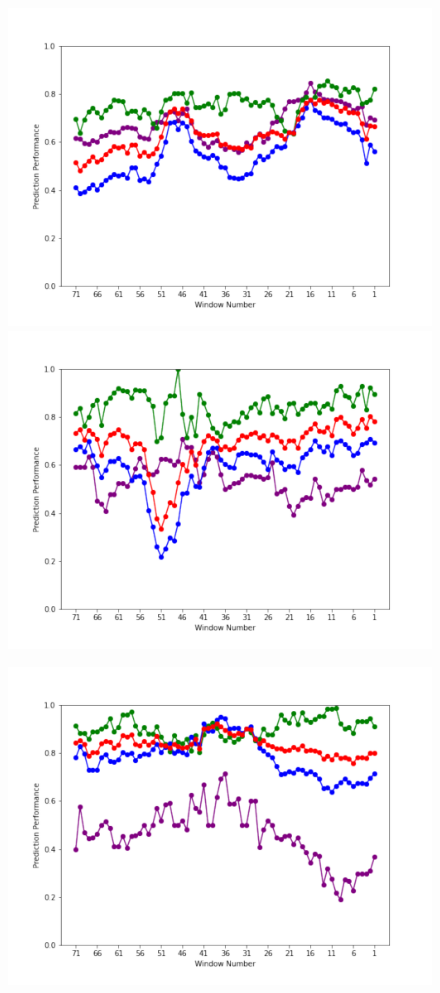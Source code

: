 \documentclass[submit]{ipsj}
\begin{document}
\begin{figure}[t]
\centering
\begin{minipage}[b]{0.65\columnwidth}
    \centering
    \includegraphics[width=1\columnwidth]{Uenaka_fig/RQ1_result/review_Nova.pdf}
    \includegraphics[width=1\columnwidth]{Uenaka_fig/RQ1_result/review_Neutron.pdf}
\end{minipage}
\begin{minipage}[b]{0.65\columnwidth}
    \centering
    \includegraphics[width=1\columnwidth]{Uenaka_fig/RQ1_result/review_Cinder.pdf}

\end{minipage}
\end{figure}
\end{document}
